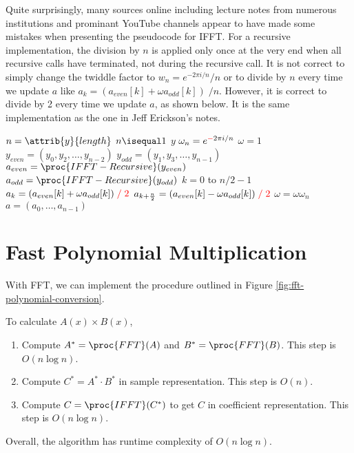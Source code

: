 Quite surprisingly, many sources online including lecture notes from numerous institutions and prominant YouTube channels appear to have made some mistakes when presenting the pseudocode for IFFT. For a recursive implementation, the division by $n$ is applied only once at the very end when all recursive calls have terminated, not during the recursive call. It is not correct to simply change the twiddle factor to $w_n = e^{-2\pi i/n} / n$ or to divide by $n$ every time we update $a$ like $a_k = (a_{even}[k] + \omega a_{odd}[k])\; / n$. However, it is correct to divide by 2 every time we update $a$, as shown below. It is the same implementation as the one in Jeff Erickson's notes.

\begin{codebox}
    \li $n = \attrib{y}{length}$
    \li \If $n \isequal 1$ \Then
        \li \Return $y$ 
    \End
    \li $\omega_n = e^{{\color{red}-}2\pi i/n}$
    \li $\omega = 1$
    \li $y_{even} = (y_0,y_2,\ldots,y_{n-2})$
    \li $y_{odd} = (y_1,y_3,\ldots,y_{n-1})$
    \li $a_{even} = \proc{IFFT-Recursive}(y_{even})$
    \li $a_{odd} = \proc{IFFT-Recursive}(y_{odd})$
    \li \For $k = 0$ to $n/2 - 1$ \Do
        \li $a_k = (a_{even}[k] + \omega a_{odd}[k])\; {\color{red} / \;2}$
        \li $a_{k+\frac{n}{2}} = (a_{even}[k] - \omega a_{odd}[k])\; {\color{red} / \;2}$
        \li $\omega = \omega \omega_n$
    \End
    \li \Return $a = (a_0,\ldots,a_{n-1})$      
\end{codebox}

\section{Fast Polynomial Multiplication}

With FFT, we can implement the procedure outlined in Figure \ref{fig:fft-polynomial-conversion}.

To calculate $A(x)\times B(x)$,

\begin{enumerate}
    \item Compute $A^* = \proc{FFT}(A)$ and $B^* = \proc{FFT}(B)$. This step is $O(n \log n)$.
    \item Compute $C^* = A^* \cdot B^*$ in sample representation. This step is $O(n)$.
    \item Compute $C = \proc{IFFT}(C^*)$ to get $C$ in coefficient representation. This step is $O(n \log n)$.
\end{enumerate}
Overall, the algorithm has runtime complexity of $O(n \log n)$.